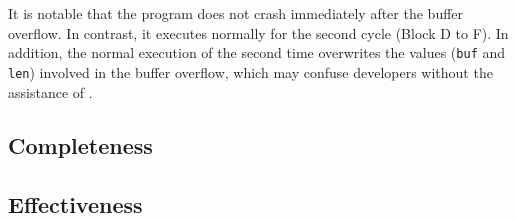 It is notable that the program does not crash immediately after the buffer 
overflow. In contrast, it executes normally for the second cycle (Block D to F). 
In addition, the normal execution of the second time overwrites the 
values (\texttt{buf} and \texttt{len}) involved in the buffer overflow, which 
may confuse developers without the assistance of \TheName.


\subsection{Completeness} \label{subsec:eva-flowaccuracy}



\subsection{Effectiveness} \label{subsec:eva-Effectiveness}

